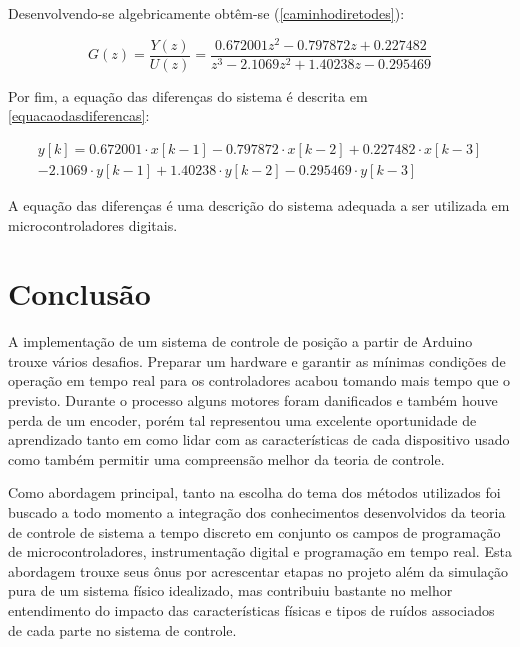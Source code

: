 \documentclass[a4paper,11pt]{article}
\begin{document}
Desenvolvendo-se algebricamente obtêm-se (\ref{caminhodiretodes}):

\begin{equation}
G(z)= \frac{Y(z)}{U(z)} = \frac{0.672001 z^{2}-0.797872 z+0.227482}{z^{3}-2.1069 z^{2}+1.40238 z-0.295469}
\label{caminhodiretodes}
\end{equation}

Por fim, a equação das diferenças do sistema é descrita em \ref{equacaodasdiferencas}:

\begin{equation}
\begin{split}
y[k]=0.672001 \cdot x[k-1]-0.797872 \cdot x[k-2]+0.227482 \cdot x[k-3] \\-2.1069 \cdot y[k-1]+1.40238 \cdot y[k-2]-0.295469 \cdot y[k-3]
\end{split}
\label{equacaodasdiferencas}
\end{equation}

A equação das diferenças é uma descrição do sistema adequada a ser utilizada em microcontroladores digitais.

\section{Conclusão}

A implementação de um sistema de controle de posição a partir de Arduino trouxe vários desafios. Preparar um hardware e garantir as mínimas condições de operação em tempo real para os controladores acabou tomando mais tempo que o previsto. Durante o processo alguns motores foram danificados e também houve perda de um encoder, porém tal representou uma excelente oportunidade de aprendizado tanto em como lidar com as características de cada dispositivo usado como também permitir uma compreensão melhor da teoria de controle.

Como abordagem principal, tanto na escolha do tema dos métodos utilizados foi buscado a todo momento a integração dos conhecimentos desenvolvidos da teoria de controle de sistema a tempo discreto em conjunto os campos de programação de microcontroladores, instrumentação digital e programação em tempo real. Esta abordagem trouxe seus ônus por acrescentar etapas no projeto além da simulação pura de um sistema físico idealizado, mas contribuiu bastante no melhor entendimento do impacto das características físicas e tipos de ruídos associados de cada parte no sistema de controle.

\end{document}

